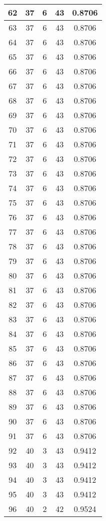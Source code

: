 \documentclass[letterpaper, 12pt]{article}
\begin{document}
\begin{longtable}{|c|c|c|c|c|}
\hline
62 & 37 & 6 & 43 & 0.8706 \\
\hline
63 & 37 & 6 & 43 & 0.8706 \\
\hline
64 & 37 & 6 & 43 & 0.8706 \\
\hline
65 & 37 & 6 & 43 & 0.8706 \\
\hline
66 & 37 & 6 & 43 & 0.8706 \\
\hline
67 & 37 & 6 & 43 & 0.8706 \\
\hline
68 & 37 & 6 & 43 & 0.8706 \\
\hline
69 & 37 & 6 & 43 & 0.8706 \\
\hline
70 & 37 & 6 & 43 & 0.8706 \\
\hline
71 & 37 & 6 & 43 & 0.8706 \\
\hline
72 & 37 & 6 & 43 & 0.8706 \\
\hline
73 & 37 & 6 & 43 & 0.8706 \\
\hline
74 & 37 & 6 & 43 & 0.8706 \\
\hline
75 & 37 & 6 & 43 & 0.8706 \\
\hline
76 & 37 & 6 & 43 & 0.8706 \\
\hline
77 & 37 & 6 & 43 & 0.8706 \\
\hline
78 & 37 & 6 & 43 & 0.8706 \\
\hline
79 & 37 & 6 & 43 & 0.8706 \\
\hline
80 & 37 & 6 & 43 & 0.8706 \\
\hline
81 & 37 & 6 & 43 & 0.8706 \\
\hline
82 & 37 & 6 & 43 & 0.8706 \\
\hline
83 & 37 & 6 & 43 & 0.8706 \\
\hline
84 & 37 & 6 & 43 & 0.8706 \\
\hline
85 & 37 & 6 & 43 & 0.8706 \\
\hline
86 & 37 & 6 & 43 & 0.8706 \\
\hline
87 & 37 & 6 & 43 & 0.8706 \\
\hline
88 & 37 & 6 & 43 & 0.8706 \\
\hline
89 & 37 & 6 & 43 & 0.8706 \\
\hline
90 & 37 & 6 & 43 & 0.8706 \\
\hline
91 & 37 & 6 & 43 & 0.8706 \\
\hline
92 & 40 & 3 & 43 & 0.9412 \\
\hline
93 & 40 & 3 & 43 & 0.9412 \\
\hline
94 & 40 & 3 & 43 & 0.9412 \\
\hline
95 & 40 & 3 & 43 & 0.9412 \\
\hline
96 & 40 & 2 & 42 & 0.9524 \\

\end{longtable}
\end{document}

